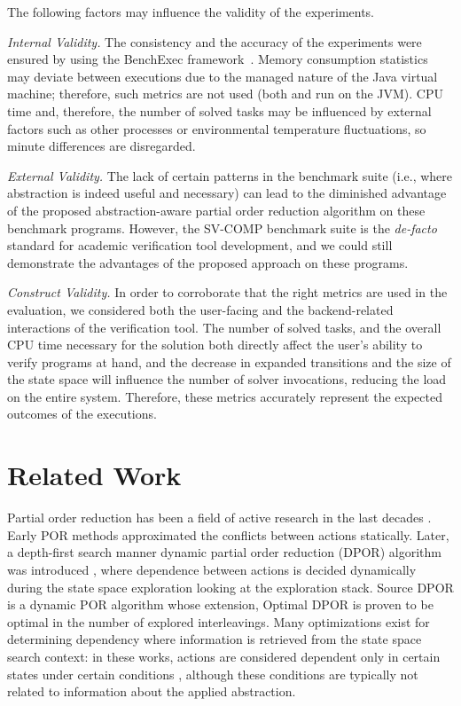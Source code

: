 \documentclass[numbook]{svjour3}
\begin{document}
The following factors may influence the validity of the experiments.

\emph{Internal Validity.} The consistency and the accuracy of the experiments were ensured by using the BenchExec framework~\cite{benchexec}. Memory consumption statistics may deviate between executions due to the managed nature of the Java virtual machine; therefore, such metrics are not used (both \Th{} and \CPA{} run on the JVM). CPU time and, therefore, the number of solved tasks may be influenced by external factors such as other processes or environmental temperature fluctuations, so minute differences are disregarded.

\emph{External Validity.} The lack of certain patterns in the benchmark suite (i.e., where abstraction is indeed useful and necessary) can lead to the diminished advantage of the proposed abstraction-aware partial order reduction algorithm on these benchmark programs. However, the SV-COMP benchmark suite is the \emph{de-facto} standard for academic verification tool development, and we could still demonstrate the advantages of the proposed approach on these programs.

\emph{Construct Validity.} In order to corroborate that the right metrics are used in the evaluation, we considered both the user-facing and the backend-related interactions of the verification tool. The number of solved tasks, and the overall CPU time necessary for the solution both directly affect the user's ability to verify programs at hand, and the decrease in expanded transitions and the size of the state space will influence the number of solver invocations, reducing the load on the entire system. Therefore, these metrics accurately represent the expected outcomes of the executions.

\section{Related Work}

Partial order reduction has been a field of active research in the last decades \cite{valmari_stubborn, godefroid-thesis, peled_10_years_of_por, principles-of-model-checking, dpor, optimal_dpor}. Early POR methods \cite{valmari_stubborn, principles-of-model-checking, godefroid-thesis} approximated the conflicts between actions statically. Later, a depth-first search manner dynamic partial order reduction (DPOR) algorithm was introduced \cite{dpor}, where dependence between actions is decided dynamically during the state space exploration looking at the exploration stack. Source DPOR is a dynamic POR algorithm \cite{optimal_dpor} whose extension, Optimal DPOR \cite{optimal_dpor} is proven to be optimal in the number of explored interleavings. Many optimizations exist for determining dependency where information is retrieved from the state space search context: in these works, actions are considered dependent only in certain states under certain conditions \cite{context_sensitive_por, optimal_dpor_observers, peephole_por, meijer_dependencies, farzan_sound_sequentialization}, although these conditions are typically not related to information about the applied abstraction.
\end{document}
